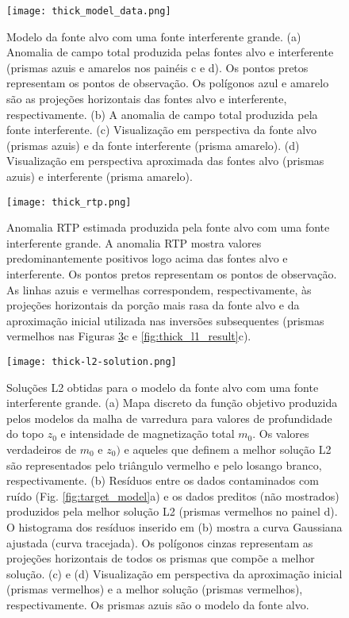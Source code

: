 \begin{figure}[!htb]
	\centering
	\texttt{[image: thick\_model\_data.png]}
	\caption{Modelo da fonte alvo com uma fonte interferente grande.
		(a) Anomalia de campo total produzida pelas fontes alvo e interferente
		(prismas azuis e amarelos nos painéis c e d). Os pontos pretos representam os pontos de observação. Os polígonos azul e amarelo são as projeções horizontais das fontes alvo e interferente, respectivamente.
		(b) A anomalia de campo total produzida pela fonte interferente. 
		(c) Visualização em perspectiva da fonte alvo (prismas azuis) e da fonte interferente (prisma amarelo). 
		(d) Visualização em perspectiva aproximada das fontes alvo (prismas azuis) e interferente (prisma amarelo).
	}
	\label{fig:thick_model}
\end{figure}


\begin{figure}[!htb]
	\centering
	\texttt{[image: thick\_rtp.png]}
	\caption{Anomalia RTP estimada produzida pela fonte alvo com uma fonte interferente grande. 
		A anomalia RTP mostra valores predominantemente positivos logo acima das fontes alvo e interferente. Os pontos pretos representam os pontos de observação. As linhas azuis e vermelhas correspondem, respectivamente, às projeções horizontais da porção mais rasa da fonte alvo e da aproximação inicial utilizada nas inversões subsequentes (prismas vermelhos nas Figuras \ref{fig:thick_l2_result}c e 
		\ref{fig:thick_l1_result}c).
	}
	\label{fig:thick_model_rtp}
\end{figure}

\begin{figure}[!htb]
	\centering
	\texttt{[image: thick-l2-solution.png]}
	\caption{Soluções L2 obtidas para o modelo da fonte alvo com uma fonte interferente grande. 
	(a) Mapa discreto da função objetivo produzida pelos modelos da malha de varredura para valores de profundidade do topo $z_{0}$ e intensidade de magnetização total $m_{0}$. 
	Os valores verdadeiros de $m_{0}$ e $z_{0})$ e aqueles que definem a melhor solução L2 são representados pelo triângulo vermelho e pelo losango branco, respectivamente.
	(b) Resíduos entre os dados contaminados com ruído (Fig. \ref{fig:target_model}a) 
	e os dados preditos (não mostrados) produzidos pela melhor solução L2 (prismas vermelhos no painel d). 
	O histograma dos resíduos inserido em (b) mostra a curva Gaussiana ajustada (curva tracejada).
	Os polígonos cinzas representam as projeções horizontais de todos os prismas que compõe a melhor solução. 
	(c) e (d) Visualização em perspectiva da aproximação inicial (prismas vermelhos) e 
	a melhor solução (prismas vermelhos), respectivamente. Os prismas azuis são o modelo da fonte alvo. 
	}
	\label{fig:thick_l2_result}
\end{figure}

